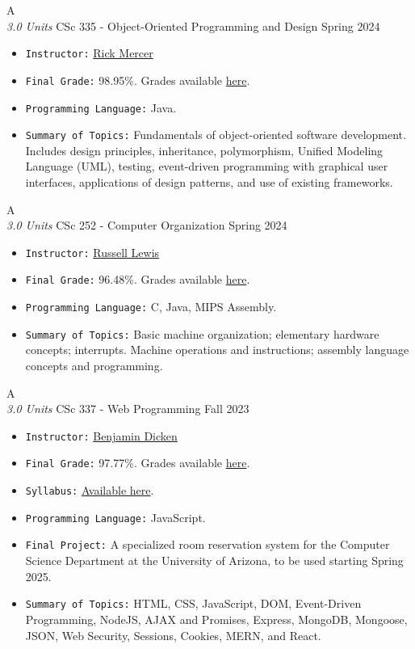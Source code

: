 \cventry
{A \\ \small{\textit{3.0 Units}}}
{CSc 335 - Object-Oriented Programming and Design}
{Spring 2024}
{}
{}
{
  \begin{itemize}
    \item \texttt{Instructor:} \href{https://www2.cs.arizona.edu/~mercer/}{Rick Mercer}
    \item \texttt{Final Grade:} 98.95\%. Grades available \href{https://mhrezaei.com/assets/cv/courses/Spring2024/CSC335/Grades.pdf}{here}.
    \item \texttt{Programming Language:} Java.
    \item \texttt{Summary of Topics:} Fundamentals of object-oriented software development. Includes design principles, inheritance, polymorphism, Unified Modeling Language (UML), testing, event-driven programming with graphical user interfaces, applications of design patterns, and use of existing frameworks.
  \end{itemize}
}


\cventry
{A \\ \small{\textit{3.0 Units}}}
{CSc 252 - Computer Organization}
{Spring 2024}
{}
{}
{
  \begin{itemize}
    \item \texttt{Instructor:} \href{https://www.cs.arizona.edu/person/russell-lewis}{Russell Lewis}
    \item \texttt{Final Grade:} 96.48\%. Grades available \href{https://mhrezaei.com/assets/cv/courses/Spring2024/CSC252/Grades.pdf}{here}.
    \item \texttt{Programming Language:} C, Java, MIPS Assembly.
    \item \texttt{Summary of Topics:} Basic machine organization; elementary hardware concepts; interrupts. Machine operations and instructions; assembly language concepts and programming.
  \end{itemize}
}

\cventry
{A \\ \small{\textit{3.0 Units}}}
{CSc 337 - Web Programming}
{Fall 2023}
{}
{}
{
  \begin{itemize}
    \item \texttt{Instructor:} \href{https://benjdd.com/}{Benjamin Dicken}
    \item \texttt{Final Grade:} 97.77\%. Grades available \href{https://mhrezaei.com/assets/cv/courses/Fall2023/CSC337/Grades.pdf}{here}.
    \item \texttt{Syllabus:} \href{https://mhrezaei.com/assets/cv/courses/Fall2023/CSC337/Syllabus.pdf}{Available here}.
    \item \texttt{Programming Language:} JavaScript.
    \item \texttt{Final Project:} A specialized room reservation system for the Computer Science Department at the University of Arizona, to be used starting Spring 2025.
    \item \texttt{Summary of Topics:} HTML, CSS, JavaScript, DOM, Event-Driven Programming, NodeJS, AJAX and Promises, Express, MongoDB, Mongoose, JSON, Web Security, Sessions, Cookies, MERN, and React.
  \end{itemize}
}

